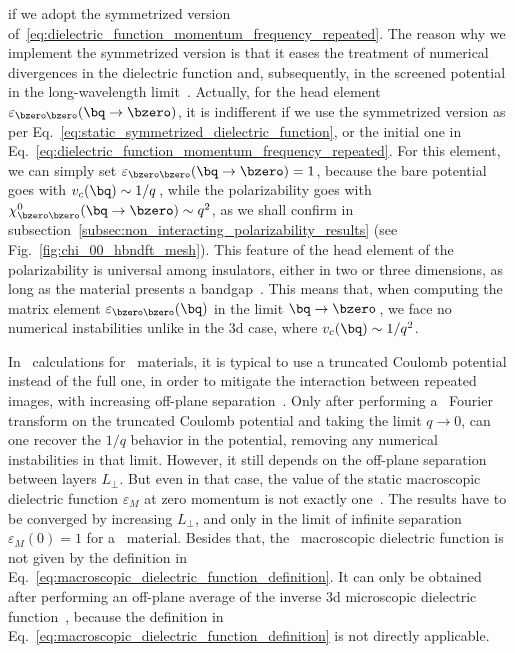 \noindent if we adopt the symmetrized version of~\eqref{eq:dielectric_function_momentum_frequency_repeated}.
The reason why we implement the symmetrized version is that it eases the treatment of numerical divergences in the dielectric function and, subsequently, in the screened potential in the long-wavelength limit~\cite{Baldereschi_Tosatti_1978,Rasmussen_Schmidt_Winther_Thygesen_2016,Shishkin_Kresse_2006}.
Actually, for the head element $\varepsilon_{\bzero \bzero} (\bq \to \bzero)$, it is indifferent if we use the symmetrized version as per Eq.~\eqref{eq:static_symmetrized_dielectric_function}, or the initial one in Eq.~\eqref{eq:dielectric_function_momentum_frequency_repeated}.
For this element, we can simply set $\varepsilon_{\bzero \bzero} (\bq \to \bzero) = 1$, because the bare potential goes with $v_c(\bq) \sim 1/q$\,, while the polarizability goes with $\chi^0_{\bzero \bzero} (\bq \to \bzero) \sim q^2$, as we shall confirm in subsection~\ref{subsec:non_interacting_polarizability_results} (see Fig.~\ref{fig:chi_00_hbndft_mesh}).
This feature of the head element of the polarizability is universal among insulators, either in two or three dimensions, as long as the material presents a bandgap~\cite{Thygesen_2017}.
This means that, when computing the matrix element $\varepsilon_{\bzero \bzero} (\bq)$ in the limit $\bq \to \bzero$\,, we face no numerical instabilities unlike in the \gls{3d} case, where $v_c(\bq) \sim 1/q^2$.

In \abinit~calculations for \bd~materials, it is typical to use a truncated Coulomb potential instead of the full one, in order to mitigate the interaction between repeated images, with increasing off-plane separation~\cite{Ismail-Beigi_2006,Huser_Olsen_Thygesen_2013,Rasmussen_Schmidt_Winther_Thygesen_2016}.
Only after performing a \bd~Fourier transform on the truncated Coulomb potential and taking the limit $q \to 0$, can one recover the $1/q$ behavior in the potential, removing any numerical instabilities in that limit.
However, it still depends on the off-plane separation between layers $L_{\perp}$.
But even in that case, the value of the static macroscopic dielectric function $\varepsilon_M$ at zero momentum is not exactly one~\cite{Huser_Olsen_Thygesen_2013}.
The results have to be converged by increasing $L_{\perp}$, and only in the limit of infinite separation $\varepsilon_M (0) = 1$ for a \bd~material.
Besides that, the \bd~macroscopic dielectric function is not given by the definition in Eq.~\eqref{eq:macroscopic_dielectric_function_definition}.
It can only be obtained after performing an off-plane average of the inverse \gls{3d} microscopic dielectric function~\cite{Huser_Olsen_Thygesen_2013,Jornada_PhD,Diana_PhD}, because the definition in Eq.~\eqref{eq:macroscopic_dielectric_function_definition} is not directly applicable.

